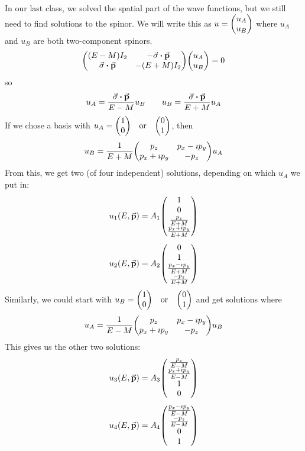 \documentclass[a4paper,twoside,master.tex]{subfiles}
\begin{document}

In our last class, we solved the spatial part of the wave functions, but we still need to find solutions to the spinor. We will write this as $ u = \mqty(u_A \\ u_B) $ where $ u_A $ and $ u_B $ are both two-component spinors.
\begin{equation}
    \mqty( (E-M)I_2 & - \va{\sigma} \vdot \va{p} \\ \va{\sigma} \vdot \va{p} & -(E+M)I_2) \mqty(u_A\\u_B) = 0
\end{equation}
so
\begin{equation}
    u_A = \frac{\va{\sigma} \vdot \va{p}}{E - M} u_B \qquad u_B = \frac{\va{\sigma} \vdot \va{p}}{E + M} u_A
\end{equation}
If we chose a basis with $ u_A = \mqty(1\\0) \qor \mqty(0\\1) $, then
\begin{equation}
    u_B = \frac{1}{E + M} \mqty(p_z & p_x - \imath p_y\\ p_x + \imath p_y & -p_z) u_A
\end{equation}
From this, we get two (of four independent) solutions, depending on which $ u_A $ we put in:
\begin{equation}
    u_1(E, \va{p}) = A_1 \mqty(1\\0\\ \frac{p_z}{E+M} \\ \frac{p_x + \imath p_y}{E + M})
\end{equation}
\begin{equation}
    u_2(E, \va{p}) = A_2 \mqty(0\\1\\ \frac{p_x - \imath p_y}{E+M} \\ \frac{-p_z}{E + M})
\end{equation}
Similarly, we could start with $ u_B = \mqty(1\\0) \qor \mqty(0\\1) $ and get solutions where
\begin{equation}
    u_A = \frac{1}{E-M} \mqty(p_z & p_x - \imath p_y \\ p_x + \imath p_y & -p_z) u_B
\end{equation}
This gives us the other two solutions:
\begin{equation}
    u_3(E, \va{p}) = A_3 \mqty(\frac{p_z}{E-M} \\ \frac{p_x + \imath p_y}{E - M} \\ 1 \\ 0)
\end{equation}
\begin{equation}
    u_4(E, \va{p}) = A_4 \mqty(\frac{p_x - \imath p_y}{E-M} \\ \frac{-p_z}{E - M} \\ 0 \\ 1)
\end{equation}
\end{document}
